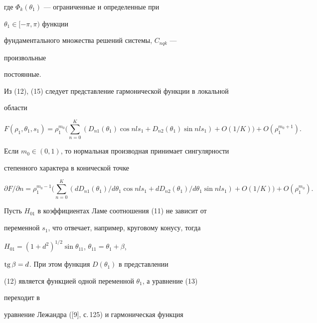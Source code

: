 где $\Phi_k(\theta_1)$ --- ограниченные и определенные при 


$\theta_1\in[-\pi,\pi)$ функции  


фундаментального множества решений системы, $C_{n q k}$ --- 


произвольные 


постоянные. 


 


Из (12), (15) следует представление гармонической функции в локальной  


области 


\begin{equation} 


F(\rho_1,\theta_1,s_1)=\rho^{m_0}_1\bigg(\sum^K_{n=0} 


(D_{n1}(\theta_1)\cos n l s_1+D_{n2}(\theta_1)\sin n l s_1)+ 


O(1/K)\bigg)+O(\rho^{m_0+1}_1). 


\end{equation} 


Если $m_0\in(0,1)$, то нормальная производная принимает сингулярности  


степенного характера в конической точке 


\begin{equation} 


\partial F/\partial n=\rho^{m_0-1}_1\bigg(\sum^K_{n=0} 


(d D_{n1}(\theta_1)/d\theta_1\cos n l s_1+ 


d D_{n2}(\theta_1)/d\theta_1\sin n l s_1)+O(1/K)\bigg)+ 


O(\rho^{m_0}_1). 


\end{equation} 


 


Пусть $H_{01}$ в коэффициентах Ламе соотношения (11) не зависит от  


переменной $s_1$, что отвечает, например, круговому конусу, тогда  


$H_{01}=(1+d^2)^{1/2}\sin\theta_{11}$, $\theta_{11}=\theta_1+\beta$, 


$\operatorname{tg}\beta=d$. При этом функция $D(\theta_1)$ в представлении  


(12) является функцией одной переменной $\theta_1$, а уравнение (13) 


переходит в  


уравнение Лежандра ([9], с.\,125) и гармоническая функция 


